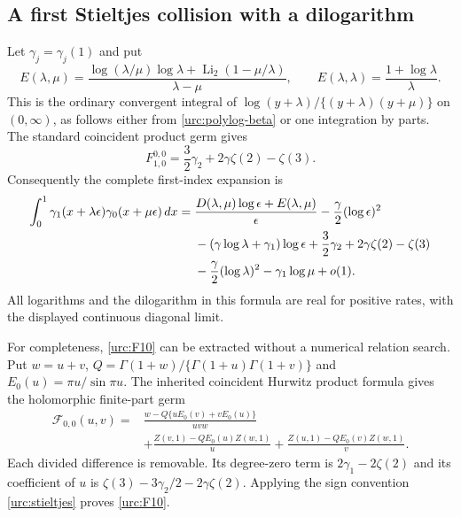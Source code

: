 \subsection{A first Stieltjes collision with a dilogarithm}

Let $\gamma_j=\gamma_j(1)$ and put
\begin{equation}\label{urc:E}
 E(\lambda,\mu)=
 \frac{\log(\lambda/\mu)\log\lambda+
               \operatorname{Li}_2(1-\mu/\lambda)}{\lambda-\mu},
 \qquad E(\lambda,\lambda)=\frac{1+\log\lambda}{\lambda}.
\end{equation}
This is the ordinary convergent integral of
$\log(y+\lambda)/\{(y+\lambda)(y+\mu)\}$ on $(0,\infty)$,
as follows either from \eqref{urc:polylog-beta} or one integration
by parts. The standard coincident product germ gives
\begin{equation}\label{urc:F10}
 F_{1,0}^{0,0}=\frac32\gamma_2+2\gamma\zeta(2)-\zeta(3).
\end{equation}
Consequently the complete first-index expansion is
\begin{align}
 \int_0^1\gamma_1(x+\lambda\epsilon)
                    \gamma_0(x+\mu\epsilon)\,dx
 ={}&\frac{D(\lambda,\mu)\log\epsilon+E(\lambda,\mu)}\epsilon
       -\frac\gamma2(\log\epsilon)^2\notag\\
 &-(\gamma\log\lambda+\gamma_1)\log\epsilon
       +\frac32\gamma_2+2\gamma\zeta(2)-\zeta(3)\notag\\
 &-\frac\gamma2(\log\lambda)^2-\gamma_1\log\mu+o(1).
 \label{urc:first-Stieltjes-example}
\end{align}
All logarithms and the dilogarithm in this formula are real for
positive rates, with the displayed continuous diagonal limit.

For completeness, \eqref{urc:F10} can be extracted without a
numerical relation search. Put $w=u+v$,
$Q=\Gamma(1+w)/\{\Gamma(1+u)\Gamma(1+v)\}$ and
$E_0(u)=\pi u/\sin\pi u$. The inherited coincident Hurwitz
product formula gives the holomorphic finite-part germ
\begin{align*}
 \mathcal F_{0,0}(u,v)
 ={}&\frac{w-Q\{uE_0(v)+vE_0(u)\}}{uvw}\\
 &+\frac{Z(v,1)-QE_0(u)Z(w,1)}u
  +\frac{Z(u,1)-QE_0(v)Z(w,1)}v.
\end{align*}
Each divided difference is removable. Its degree-zero term is
$2\gamma_1-2\zeta(2)$ and its coefficient of $u$ is
$\zeta(3)-3\gamma_2/2-2\gamma\zeta(2)$. Applying the sign
convention \eqref{urc:stieltjes} proves \eqref{urc:F10}.

